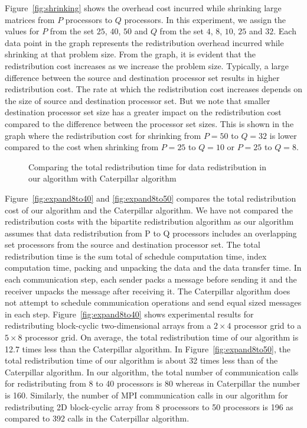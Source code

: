 \documentclass[letterpaper]{llncs}
\begin{document}
\vspace{-0.02in}
Figure~\ref{fig:shrinking} shows the overhead cost incurred while shrinking large matrices from $P$ processors to $Q$ processors. In this 
experiment, we assign the values for $P$ from the set $25$, $40$, $50$ and $Q$ from the set $4$, $8$, $10$, $25$  and $32$.
Each data point in the graph 
represents the redistribution overhead incurred while shrinking at that problem size. From the graph, it is evident that the redistribution 
cost increases as we increase the problem size. Typically, a large difference between the 
source and destination processor set results in higher redistribution cost. The rate at which the redistribution cost increases  depends on the size 
of source and destination processor set. But we note that  smaller destination processor set size 
has a greater impact on the redistribution cost compared to the difference between the processor set sizes.
This is shown in the graph where the redistribution cost for shrinking from $P=50$ to $Q=32$ is lower compared to the cost  
when shrinking from $P=25$ to $Q=10$ or $P=25$ to $Q=8$.
\begin{figure}[th]
\caption{Comparing the total redistribution time for data redistribution in our algorithm with  Caterpillar algorithm}
\end{figure}

\vspace{-0.02in}
Figure~\ref{fig:expand8to40} and \ref{fig:expand8to50} compares  the total redistribution cost of our algorithm and the Caterpillar algorithm. 
We have not compared the redistribution costs with the bipartite redistribution algorithm as our algorithm assumes that data redistribution from 
P to Q processors includes an overlapping set processors from the 
source and destination processor set. 
The total redistribution time is the sum total of schedule computation time, index computation time, 
packing and unpacking the data and the data transfer time.
 In each communication step, each sender packs a message before sending it and the receiver unpacks
the message after receiving it. The Caterpillar algorithm does not attempt to schedule communication operations and send equal sized messages in each step. Figure~\ref{fig:expand8to40} shows experimental results for redistributing block-cyclic two-dimensional arrays from a $2 \times 4$ processor 
grid to a $5 \times 8$ processor grid. On average, the total redistribution time of our algorithm is 12.7 times less than the Caterpillar algorithm. 
In Figure~\ref{fig:expand8to50}, the total redistribution time of our algorithm is about 32 times less than  of the Caterpillar algorithm. 
In our algorithm, the total number of communication calls for redistributing from 8 to 40 processors is 80 whereas in Caterpillar the number is 160. Similarly, the number of MPI communication calls in our algorithm for redistributing 2D block-cyclic array from 8 processors to 50 processors is 196 as compared to 392 calls in the Caterpillar algorithm.
\end{document}
